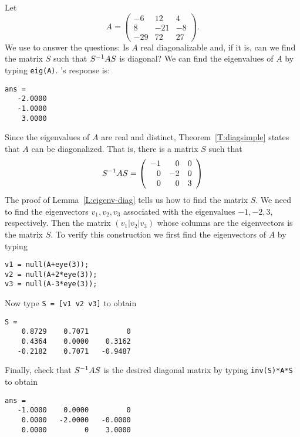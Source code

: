 Let
\begin{equation*}
A= \left( \begin{array}{rrr} -6 & 12 & 4 \\
 8 & -21 & -8 \\
  -29 & 72 & 27 \end{array} \right).
\end{equation*}
We use \Matlab to answer the questions:  Is $A$ real diagonalizable 
and, if it is, can we find the matrix $S$ such that $S^{-1} AS$ is diagonal?
We can find the eigenvalues of $A$ by typing {\tt eig(A)}. \Matlabp's
response is:
\begin{verbatim}
ans =
   -2.0000
   -1.0000
    3.0000
\end{verbatim}
Since the eigenvalues of $A$ are real and distinct, 
Theorem~\ref{T:diagsimple} states that $A$ can be diagonalized.  
That is, there is a matrix $S$ such that 
\[
S^{-1} AS = \left(\begin{array}{rrr} -1 & 0 & 0 \\ 0 & -2 & 0\\
0 & 0 & 3 \end{array}\right)
\]
The proof of Lemma~\ref{L:eigenv-diag} tells us how to find the 
matrix $S$.  We need to find the eigenvectors $v_1,v_2,v_3$ 
associated with the eigenvalues $-1,-2,3$, respectively.  Then 
the matrix $(v_1|v_2|v_3)$ whose columns are the eigenvectors is 
the matrix $S$. To verify this construction we first find the 
eigenvectors of $A$ by typing
\begin{verbatim}
v1 = null(A+eye(3));
v2 = null(A+2*eye(3));
v3 = null(A-3*eye(3));
\end{verbatim} 
Now type {\tt S = [v1 v2 v3]} to obtain
\begin{verbatim}
S =
    0.8729    0.7071         0
    0.4364    0.0000    0.3162
   -0.2182    0.7071   -0.9487
\end{verbatim}
Finally, check that $S^{-1} AS$ is the desired diagonal matrix by 
typing {\tt inv(S)*A*S} to obtain
\begin{verbatim}
ans =
   -1.0000    0.0000         0
    0.0000   -2.0000   -0.0000
    0.0000         0    3.0000
\end{verbatim}

